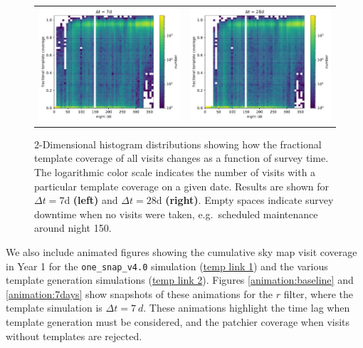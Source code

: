 \documentclass[preprintm,linenumbers]{aastex631}
\newcommand{\baseline}{\texttt{one\_snap\_v4.0}\xspace}
\begin{document}
  \begin{figure}
      \centering
      			\begin{tabular}{c c}
      \includegraphics[width=0.5\linewidth]{results/fractional_template_coverage_first_year_one_snap_v4_0_10yrs_db_noDD_noTwi_7_2d_hist.pdf} &
            \includegraphics[width=0.5\linewidth]{results/fractional_template_coverage_first_year_one_snap_v4_0_10yrs_db_noDD_noTwi_28_2d_hist.pdf} \\
\end{tabular}
\caption{2-Dimensional histogram distributions showing how the fractional template coverage of all visits changes as a function of survey time.
The logarithmic color scale indicates the number of visits with a particular template coverage on a given date. Results are shown for $\Delta t = 7$d \textbf{(left)} and $\Delta t = 28$d \textbf{(right)}.
Empty spaces indicate survey downtime when no visits were taken, e.g.\ scheduled maintenance around night 150.
}
\label{fig:fractional_template_coverage-2d}
  \end{figure}
  
		We also include animated figures showing the cumulative sky map visit coverage in Year 1 for the \baseline simulation (\href{https://cuillin.roe.ac.uk/~jrobinson/LSST-Incremental-Templates-Analysis-Paper_4_0/first_year_one_snap_v4_0_10yrs_db_noDD_noTwi_tscale-7_nside-256_CountMetric_r_and_night_lt_365_and_scheduler_note_not_like_DD_and_scheduler_note_not_like_twilight_HEAL.mp4}{temp link 1}) and the various template generation simulations (\href{https://cuillin.roe.ac.uk/~jrobinson/LSST-Incremental-Templates-Analysis-Paper_4_0/first_year_one_snap_v4_0_10yrs_db_noDD_noTwi_tscale-7_nside-256_doAllTemplateMetrics_reduceCount_r_and_night_lt_365_and_scheduler_note_not_like_DD_and_scheduler_note_not_like_twilight_HEAL.mp4}{temp link 2}). 
  Figures \ref{animation:baseline} and \ref{animation:7days} show snapshots of these animations for the $r$ filter, where the template simulation is $\Delta t = 7\ \si{d}$.
		These animations highlight the time lag when template generation must be considered, and the patchier coverage when visits without templates are rejected.
		
\end{document}
